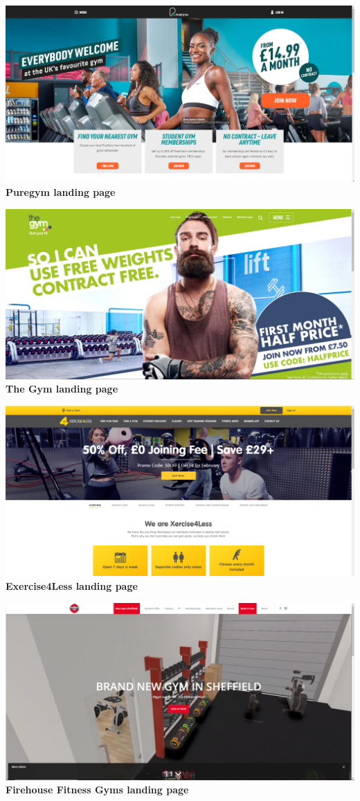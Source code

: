\documentclass[12pt,a4paper]{article}
\begin{document}
\begin{center}
	\includegraphics[width=0.7\linewidth]{img/gym/puregym-landing.png}\\
	 \textbf{Puregym landing page}
\end{center}

\begin{center}
	\includegraphics[width=0.7\linewidth]{img/gym/the-gym-landing.png}\\
	\textbf{The Gym landing page}
\end{center}

\begin{center}
	\includegraphics[width=0.7\linewidth]{img/gym/exercise4less-landing.png}\\
	 \textbf{Exercise4Less landing page}
\end{center}

\begin{center}
	\includegraphics[width=0.7\linewidth]{img/gym/firehouse-landing.png}\\
	\textbf{Firehouse Fitness Gyms landing page}
\end{center}
\end{document}
